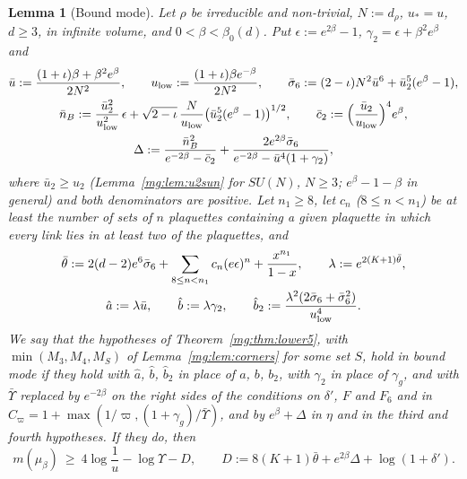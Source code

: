 \documentclass[11pt,a4paper]{article}
\newtheorem{lemma}[theorem]{Lemma}
\theoremstyle{definition}
\theoremstyle{remark}
\begin{document}
\begin{lemma}[Bound mode]\label{mg:lem:boundmode}
Let $\rho$ be irreducible and non-trivial, $N:=d_\rho$, $u_*=u$, $d\ge3$, in infinite volume, and $0<\beta<\beta_0(d)$. Put $\epsilon:=e^{2\beta}-1$, $\gamma_2=\epsilon+\beta^2e^\beta$ and
\begin{gather*}
\bar u:=\frac{(1+\iota)\beta+\beta^2e^\beta}{2N^2},\qquad u_{\rm low}:=\frac{(1+\iota)\beta e^{-\beta}}{2N^2},\qquad\bar\sigma_6:=(2-\iota)N^2\bar u^6+\bar u_2^5(e^\beta-1),\\
\bar n_B:=\frac{\bar u_2^2}{u_{\rm low}^2}\,\epsilon+\sqrt{2-\iota}\,\frac N{u_{\rm low}}\bigl(\bar u_2^5(e^\beta-1)\bigr)^{1/2},\qquad\bar c_2:=\Bigl(\frac{\bar u_2}{u_{\rm low}}\Bigr)^4e^\beta,\\
\Delta:=\frac{\bar n_B^2}{e^{-2\beta}-\bar c_2}+\frac{2e^{2\beta}\bar\sigma_6}{e^{-2\beta}-\bar u^4(1+\gamma_2)},
\end{gather*}
where $\bar u_2\ge u_2$ (Lemma~\ref{mg:lem:u2sun} for $SU(N)$, $N\ge3$; $e^\beta-1-\beta$ in general) and both denominators are positive. Let $n_1\ge8$, let $c_n$ ($8\le n<n_1$) be at least the
number of sets of $n$ plaquettes containing a given plaquette in which every link lies in at least two of the plaquettes, and
\begin{gather*}
\bar\theta:=2(d-2)e^6\bar\sigma_6+\sum_{8\le n<n_1}c_n(e\epsilon)^n+\frac{x^{n_1}}{1-x},\qquad\lambda:=e^{2(K+1)\bar\theta},\\
\hat a:=\lambda\bar u,\qquad\hat b:=\lambda\gamma_2,\qquad\hat b_2:=\frac{\lambda^2(2\bar\sigma_6+\bar\sigma_6^2)}{u_{\rm low}^4}.
\end{gather*}
We say that the hypotheses of Theorem~\ref{mg:thm:lower5}, with $\min(M_3,M_4,M_S)$ of Lemma~\ref{mg:lem:corners} for some set $S$, hold \emph{in bound mode} if they hold with $\hat a$, $\hat b$,
$\hat b_2$ in place of $a$, $b$, $b_2$, with $\gamma_2$ in place of $\gamma_g$, and with $\bar\Upsilon$ replaced by $e^{-2\beta}$ on the right sides of the conditions on $\delta'$, $F$ and $F_6$ and in
$C_\varpi=1+\max(1/\varpi,(1+\gamma_g)/\bar\Upsilon)$, and by $e^\beta+\Delta$ in $\eta$ and in the third and fourth hypotheses. If they do, then
\[
m(\mu_\beta)\ \ge\ 4\log\frac1u-\log\Upsilon-D,\qquad D:=8(K+1)\bar\theta+e^{2\beta}\Delta+\log(1+\delta').
\]
\end{lemma}
\end{document}
